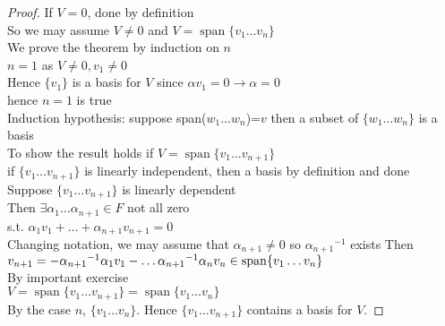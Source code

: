 \documentclass[11pt]{article}
\DeclareMathOperator{\Span}{span}
\begin{document}
\begin{proof}
	If $V=0$, done by definition\\
So we may assume $V\neq 0$ and $V=\Span\{v_1\ldots v_n\}$\\
We prove the theorem by induction on $n$\\
$n=1$ as $V\neq 0, v_1\neq 0$\\
Hence $\{v_1\}$ is a basis for $V$ since ${\alpha} v_1=0\rightarrow {\alpha}=0$\\
hence $n=1$ is true\\
Induction hypothesis: suppose span($w_1\ldots w_n$)=$v$ then a subset of $\{w_1\ldots w_n\}$ is a basis\\
To show the result holds if $V=\Span\{v_1\ldots v_{n+1}\}$\\
if $\{v_1\ldots v_{n+1}\}$ is linearly independent, then a basis by definition and done\\
Suppose $\{v_1\ldots v_{n+1}\}$ is linearly dependent\\
Then $\exists \alpha_1\ldots\alpha_{n+1}\in F$ not all zero\\
s.t. $\alpha_1v_1+\ldots+\alpha_{n+1}v_{n+1}=0$\\
Changing notation, we may assume that $\alpha_{n+1}\neq 0$ so ${\alpha_{n+1}}^{-1}$ exists
Then $v_{n+1}=-{\alpha_{n+1}}^{-1}\alpha_1v_1-\ldots\-{\alpha_{n+1}}^{-1}\alpha_nv_n\in \Span\{v_1\ldots v_n\}$\\
By important exercise\\
$V=\Span\{v_1\ldots v_{n+1}\}=\Span\{v_1\ldots v_n\}$\\
By the case $n$, $\{v_1\ldots v_n\}$. Hence $\{v_1\ldots v_{n+1}\}$ contains a basis for $V$.
\end{proof}
\end{document}
